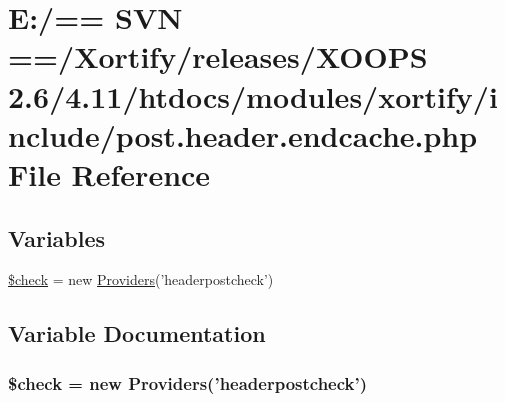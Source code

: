 \hypertarget{post_8header_8endcache_8php}{\section{E\-:/== S\-V\-N ==/\-Xortify/releases/\-X\-O\-O\-P\-S 2.6/4.11/htdocs/modules/xortify/include/post.header.\-endcache.\-php File Reference}
\label{post_8header_8endcache_8php}
}
\subsection*{Variables}
\begin{DoxyCompactItemize}
\item 
\hyperlink{post_8header_8endcache_8php_a830cf70d25fefacddcf4c6bc3fd7a0e0}{\$check} = new \hyperlink{class_providers}{Providers}('headerpostcheck')
\end{DoxyCompactItemize}


\subsection{Variable Documentation}
\hypertarget{post_8header_8endcache_8php_a830cf70d25fefacddcf4c6bc3fd7a0e0}{
\subsubsection[{\$check}]{\setlength{\rightskip}{0pt plus 5cm}\$check = new {\bf Providers}('headerpostcheck')}}\label{post_8header_8endcache_8php_a830cf70d25fefacddcf4c6bc3fd7a0e0}
